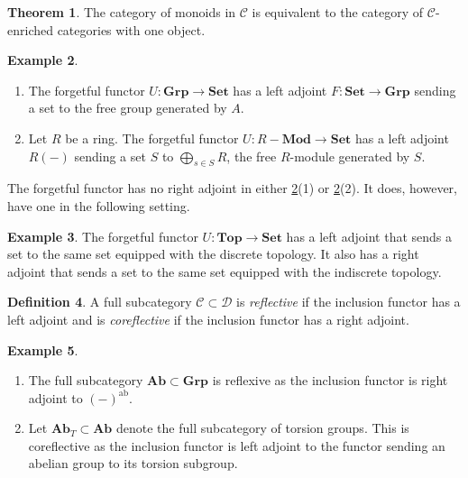 \documentclass[10pt,letterpaper,cm]{nupset}
\theoremstyle{definition}
\newtheorem{definition}{Definition}[section]
\newtheorem{exmp}[definition]{Example}
\theoremstyle{theorem}
\newtheorem{theorem}[definition]{Theorem}
\theoremstyle{remark}
\newcommand{\1}{\mathbf{1}}
\renewcommand{\c}{\mathscr{C}}
\renewcommand{\d}{\mathscr{D}}
\newcommand{\0}{\vec 0}
\DeclareMathOperator{\ab}{ab}
\begin{document}
\begin{theorem}
The category of monoids in $\c$ is equivalent to the category of $\c$-enriched categories with one object.
\end{theorem}

\smallskip

\begin{exmp}\label{U1} $ $
\begin{enumerate}[label=(\arabic*)]
\item The forgetful functor $U: \mathbf{Grp} \to \mathbf{Set}$ has a left adjoint $F: \mathbf{Set} \to \mathbf{Grp}$ sending a set to the free group generated by $A$. 
\item Let $R$ be a ring. The forgetful functor $U: R{-}\mathbf{Mod}\to \mathbf{Set}$ has a left adjoint $R(-)$ sending a set $S$ to $\bigoplus_{s\in S} R$, the free $R$-module generated by $S$.
\end{enumerate}
\end{exmp}



The forgetful functor has no right adjoint in either \cref{U1}(1) or \cref{U1}(2). It does, however, have one in the following setting.


\begin{exmp}
The forgetful functor $U: \mathbf{Top} \to \mathbf{Set}$ has a left adjoint that sends a set to the same set equipped with the discrete topology.  It also has a right adjoint that sends a set to the same set equipped with the indiscrete topology.
\end{exmp}

\smallskip

\begin{definition}
A full subcategory $\c \subset \d$ is \textit{reflective} if the inclusion functor has a left adjoint and is \textit{coreflective} if the inclusion functor has a right adjoint. 
\end{definition}

\begin{exmp} $ $
\begin{enumerate}
\item The full subcategory $\mathbf{Ab}\subset \mathbf{Grp}$ is reflexive as the inclusion functor is right adjoint to $\left(-\right)^{\ab}$.
\item
Let $\mathbf{Ab}_T\subset \mathbf{Ab}$ denote the full subcategory of torsion groups. This is coreflective as the inclusion functor is left adjoint to the functor sending an abelian group to its torsion subgroup.
\end{enumerate}
\end{exmp}
\end{document}
